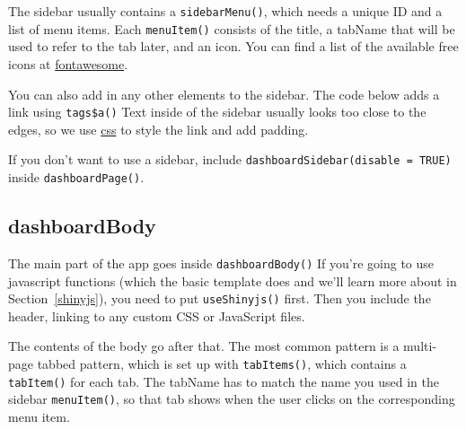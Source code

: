 \documentclass[
  oneside]{book}
\newenvironment{Shaded}{\begin{snugshade}}{\end{snugshade}}
\newcommand{\AttributeTok}[1]{\textcolor[rgb]{0.77,0.63,0.00}{#1}}
\newcommand{\FunctionTok}[1]{\textcolor[rgb]{0.00,0.00,0.00}{#1}}
\newcommand{\NormalTok}[1]{#1}
\newcommand{\SpecialCharTok}[1]{\textcolor[rgb]{0.00,0.00,0.00}{#1}}
\newcommand{\StringTok}[1]{\textcolor[rgb]{0.31,0.60,0.02}{#1}}
\begin{document}
The sidebar usually contains a \texttt{sidebarMenu}\texttt{()}, which needs a unique ID and a list of menu items. Each \texttt{menuItem}\texttt{()} consists of the \AttributeTok{title}, a \AttributeTok{tabName} that will be used to refer to the tab later, and an \AttributeTok{icon}. You can find a list of the available free icons at \href{https://fontawesome.com/icons?d=gallery\&m=free}{fontawesome}.

You can also add in any other elements to the sidebar. The code below adds a link using \texttt{tags\$a}\texttt{()} Text inside of the sidebar usually looks too close to the edges, so we use \protect\hyperlink{CSS}{css} to style the link and add padding.

\begin{Shaded}
\end{Shaded}

\begin{info}
If you don't want to use a sidebar, include \texttt{dashboardSidebar(disable\ =\ TRUE)} inside \texttt{dashboardPage}\texttt{()}.

\end{info}

\hypertarget{dashboardbody}{%
\subsection{dashboardBody}\label{dashboardbody}}

The main part of the app goes inside \texttt{dashboardBody}\texttt{()} If you're going to use javascript functions (which the basic template does and we'll learn more about in Section~\ref{shinyjs}), you need to put \texttt{useShinyjs}\texttt{()} first. Then you include the header, linking to any custom CSS or JavaScript files.

The contents of the body go after that. The most common pattern is a multi-page tabbed pattern, which is set up with \texttt{tabItems}\texttt{()}, which contains a \texttt{tabItem}\texttt{()} for each tab. The \AttributeTok{tabName} has to match the name you used in the sidebar \texttt{menuItem}\texttt{()}, so that tab shows when the user clicks on the corresponding menu item.
\end{document}
